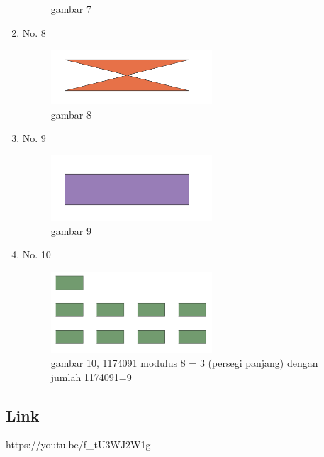 \begin{enumerate}
\begin{figure}[H]
		\centering
		\caption{gambar 7}
	\end{figure}
	\item No. 8
	
	\begin{figure}[H]
		\includegraphics[width=6cm]{figures/Tugas2/1174091/8.png}
		\centering
		\caption{gambar 8}
	\end{figure}
	\item No. 9
	
	\begin{figure}[H]
		\includegraphics[width=6cm]{figures/Tugas2/1174091/9.png}
		\centering
		\caption{gambar 9}
	\end{figure}
	\item No. 10
	
	\begin{figure}[H]
		\includegraphics[width=6cm]{figures/Tugas2/1174091/10.png}
		\centering
		\caption{gambar 10, 1174091 modulus 8 = 3 (persegi panjang) dengan jumlah 1174091=9}
	\end{figure}
\end{enumerate}
\subsection{Link}
https://youtu.be/f\_tU3WJ2W1g